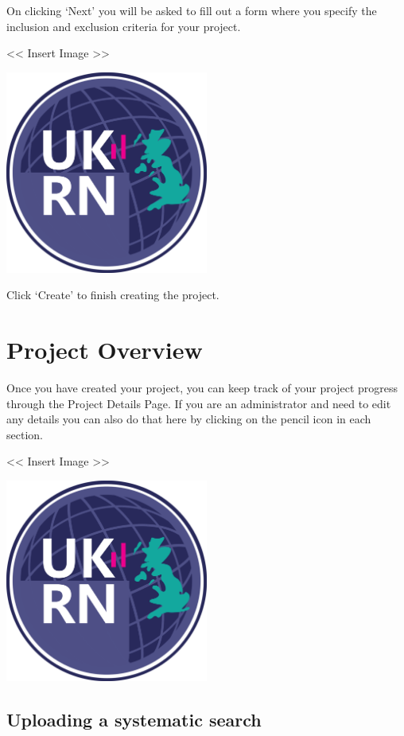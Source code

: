 \documentclass[]{book}
\begin{document}
On clicking `Next' you will be asked to fill out a form where you
specify the inclusion and exclusion criteria for your project.

\textless{}\textless{} Insert Image \textgreater{}\textgreater{}

\includegraphics[width=0.50000\textwidth,height=0.50000\textwidth]{figs/evidence-triangle.png}

Click `Create' to finish creating the project.

\chapter{Project Overview}\label{projectOverview}

Once you have created your project, you can keep track of your project
progress through the Project Details Page. If you are an administrator
and need to edit any details you can also do that here by clicking on
the pencil icon in each section.

\textless{}\textless{} Insert Image \textgreater{}\textgreater{}

\includegraphics[width=0.50000\textwidth,height=0.50000\textwidth]{figs/evidence-triangle.png}

\section{Uploading a systematic
search}\label{uploading-a-systematic-search}
\end{document}
